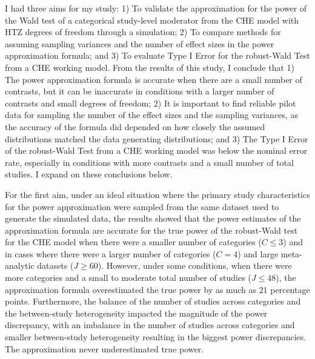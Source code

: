 I had three aims for my study: 1) To validate the approximation for the power of the Wald test of a categorical study-level moderator from the CHE model with HTZ degrees of freedom through a simulation; 2) To compare methods for assuming sampling variances and the number of effect sizes in the power approximation formula; and 3) To evaluate Type I Error for the robust-Wald Test from a CHE working model. From the results of this study, I conclude that 1) The power approximation formula is accurate when there are a small number of contrasts, but it can be inaccurate in conditions with a larger number of contrasts and small degrees of freedom; 2) It is important to find reliable pilot data for sampling the number of the effect sizes and the sampling variances, as the accuracy of the formula did depended on how closely the assumed distributions matched the data generating distributions; and 3) The Type I Error of the robust-Wald Test from a CHE working model was below the nominal error rate, especially in conditions with more contrasts and a small number of total studies. I expand on these conclusions below.  

For the first aim, under an ideal situation where the primary study characteristics for the power approximation were sampled from the same dataset used to generate the simulated data, the results showed that the power estimates of the approximation formula are accurate for the true power of the robust-Wald test for the CHE model when there were a smaller number of categories ($C \leq 3$) and in cases where there were a larger number of categories ($C = 4$) and large meta-analytic datasets ($J \geq 60$). However, under some conditions, when there were more categories and a small to moderate total number of studies ($J \leq 48$), the approximation formula overestimated the true power by as much as $21$ percentage points. Furthermore, the balance of the number of studies across categories and the between-study heterogeneity impacted the magnitude of the power discrepancy, with an imbalance in the number of studies across categories and smaller between-study heterogeneity resulting in the biggest power discrepancies. The approximation never underestimated true power. 


